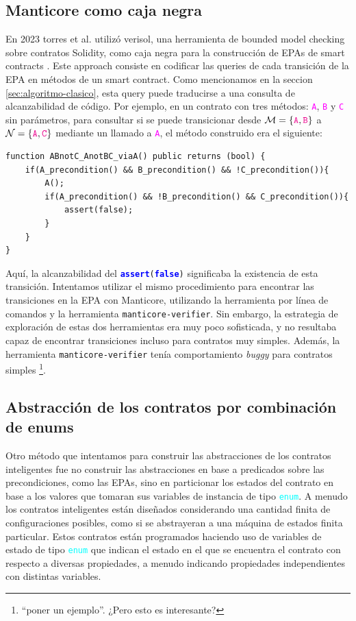 \subsection{Manticore como caja negra}
En 2023 torres et al. utilizó verisol, una herramienta de bounded model checking sobre contratos Solidity, como caja negra para la construcción de EPAs de smart contracts \cite{torres} \cite{verisol}.
Este approach consiste en codificar las queries de cada transición de la EPA en métodos de un smart contract.
Como mencionamos en la seccion \ref{sec:algoritmo-clasico}, esta query puede traducirse a una consulta de alcanzabilidad de código.
Por ejemplo, en un contrato con tres métodos: \textcolor{magenta}{\texttt{A}}, \textcolor{magenta}{\texttt{B}} y \textcolor{magenta}{\texttt{C}} sin parámetros, para consultar si se puede transicionar desde $\mathcal{M}=\{\textcolor{magenta}{\texttt{A}}, \textcolor{magenta}{\texttt{B}}\}$ a $\mathcal{N} = \{\textcolor{magenta}{\texttt{A}}, \textcolor{magenta}{\texttt{C}}\}$ mediante un llamado a \textcolor{magenta}{\texttt{A}}, el método construido era el siguiente:
\begin{lstlisting}[language=Solidity]
function ABnotC_AnotBC_viaA() public returns (bool) {
    if(A_precondition() && B_precondition() && !C_precondition()){
        A();
        if(A_precondition() && !B_precondition() && C_precondition()){
            assert(false);
        }
    }
}
\end{lstlisting}

Aquí, la alcanzabilidad del \texttt{\textcolor{blue}{\textbf{assert}}(\textcolor{blue}{\textbf{false}})} significaba la existencia de esta transición.
Intentamos utilizar el mismo procedimiento para encontrar las transiciones en la EPA con Manticore, utilizando la herramienta por línea de comandos y la herramienta \texttt{manticore-verifier}.
Sin embargo, la estrategia de exploración de estas dos herramientas era muy poco sofisticada, y no resultaba capaz de encontrar transiciones incluso para contratos muy simples.
Además, la herramienta \texttt{manticore-verifier} tenía comportamiento \textit{buggy} para contratos simples \footnote{``poner un ejemplo''. ¿Pero esto es interesante?}.

\subsection{Abstracción de los contratos por combinación de enums}
Otro método que intentamos para construir las abstracciones de los contratos inteligentes fue no construir las abstracciones en base a predicados sobre las precondiciones, como las EPAs, sino en particionar los estados del contrato en base a los valores que tomaran sus variables de instancia de tipo \textcolor{cyan}{\texttt{enum}}.
A menudo los contratos inteligentes están diseñados considerando una cantidad finita de configuraciones posibles, como si se abstrayeran a una máquina de estados finita particular.
Estos contratos están programados haciendo uso de variables de estado de tipo \textcolor{cyan}{\texttt{enum}} que indican el estado en el que se encuentra el contrato con respecto a diversas propiedades, a menudo indicando propiedades independientes con distintas variables.

